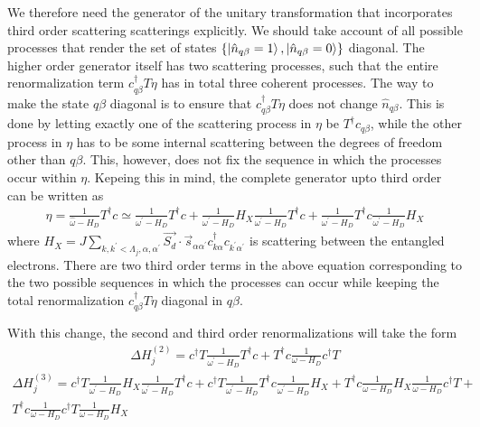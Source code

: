 \documentclass[12pt]{revtex4-2}
\begin{document}
We therefore need the generator of the unitary transformation that incorporates third order scattering scatterings explicitly. We should take account of all possible processes that render the set of states \(\left\{\ket{\hat n_{q\beta}=1},\ket{\hat n_{q\beta}=0}\right\}\) diagonal. The higher order generator itself has two scattering processes, such that the entire renormalization term \(c^\dagger_{q\beta} T \eta\) has in total three coherent processes. The way to make the state \(q\beta\) diagonal is to ensure that \(c^\dagger_{q\beta} T \eta\) does not change \(\hat n_{q\beta}\). This is done by letting exactly one of the scattering process in \(\eta\)  be \(T^\dagger c_{q\beta}\), while the other process in \(\eta\) has to be some internal scattering between the degrees of freedom other than \(q\beta\). This, however, does not fix the sequence in which the processes occur within \(\eta\). Kepeing this in mind, the complete generator upto third order can be written as
\begin{align}
	\eta = \frac{1}{\hat \omega - H_D}T^\dagger c \simeq \frac{1}{\omega^\prime - H_D}T^\dagger c + \frac{1}{\omega^\prime - H_D}H_X \frac{1}{\omega^\prime - H_D} T^\dagger c + \frac{1}{\omega^\prime - H_D} T^\dagger c \frac{1}{\omega^\prime - H_D} H_X
\end{align}
where \(H_X = J \sum_{k,k^\prime < \Lambda_j, \alpha,\alpha^\prime}\vec{S_d}\cdot\vec{s}_{\alpha \alpha^\prime}c^\dagger_{k\alpha}c_{k^\prime\alpha^\prime}\) is scattering between the entangled electrons. There are two third order terms in the above equation corresponding to the two possible sequences in which the processes can occur while keeping the total renormalization \(c^\dagger_{q\beta}T \eta\) diagonal in \(q\beta\).

With this change, the second and third order renormalizations will take the form
\begin{align}
	\Delta H^{(2)}_j = c^\dagger T \frac{1}{\omega^\prime - H_D}T^\dagger c + T^\dagger c \frac{1}{\omega - H_D}c^\dagger T
\end{align}
\begin{align}
	\Delta H^{(3)}_j = c^\dagger T \frac{1}{\omega^\prime - H_D} H_X \frac{1}{\omega^\prime - H_D} T^\dagger c + c^\dagger T \frac{1}{\omega^\prime - H_D} T^\dagger c \frac{1}{\omega^\prime - H_D} H_X + T^\dagger c \frac{1}{\omega - H_D} H_X \frac{1}{\omega - H_D} c^\dagger T + \nonumber\\
	T^\dagger c \frac{1}{\omega - H_D} c^\dagger T \frac{1}{\omega - H_D} H_X
\end{align}
\end{document}

